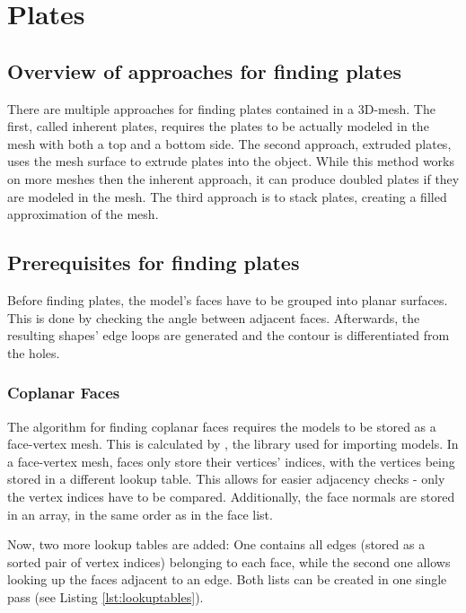 \documentclass[../ClassicThesis.tex]{subfiles}
\begin{document}
\chapter{Plates}\label{ch:plates}

\section{Overview of approaches for finding plates}

There are multiple approaches for finding plates contained in a 3D-mesh. The first, called inherent plates, requires the plates to be actually modeled in the mesh with both a top and a bottom side. The second approach, extruded plates, uses the mesh surface to extrude plates into the object. While this method works on more meshes then the inherent approach, it can produce doubled plates if they are modeled in the mesh. The third approach is to stack plates, creating a filled approximation of the mesh.

\section{Prerequisites for finding plates}

Before finding plates, the model's faces have to be grouped into planar surfaces. This is done by checking the angle between adjacent faces. Afterwards, the resulting shapes' edge loops are generated and the contour is differentiated from the holes.

\subsection{Coplanar Faces}

The algorithm for finding coplanar faces requires the models to be stored as a face-vertex mesh. This is calculated by \meshlib, the library used for importing models. In a face-vertex mesh, faces only store their vertices' indices, with the vertices being stored in a different lookup table. This allows for easier adjacency checks - only the vertex indices have to be compared. Additionally, the face normals are stored in an array, in the same order as in the face list.

Now, two more lookup tables are added: One contains all edges (stored as a sorted pair of vertex indices) belonging to each face, while the second one allows looking up the faces adjacent to an edge. Both lists can be created in one single pass (see Listing \ref{lst:lookuptables}). 
\end{document}
